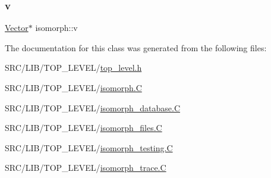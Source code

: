 \subsubsection{\texorpdfstring{v}{v}}
{\footnotesize\ttfamily \mbox{\hyperlink{class_vector}{Vector}}$\ast$ isomorph\+::v}



The documentation for this class was generated from the following files\+:\begin{DoxyCompactItemize}
\item 
S\+R\+C/\+L\+I\+B/\+T\+O\+P\+\_\+\+L\+E\+V\+E\+L/\mbox{\hyperlink{top__level_8h}{top\+\_\+level.\+h}}\item 
S\+R\+C/\+L\+I\+B/\+T\+O\+P\+\_\+\+L\+E\+V\+E\+L/\mbox{\hyperlink{isomorph_8_c}{isomorph.\+C}}\item 
S\+R\+C/\+L\+I\+B/\+T\+O\+P\+\_\+\+L\+E\+V\+E\+L/\mbox{\hyperlink{isomorph__database_8_c}{isomorph\+\_\+database.\+C}}\item 
S\+R\+C/\+L\+I\+B/\+T\+O\+P\+\_\+\+L\+E\+V\+E\+L/\mbox{\hyperlink{isomorph__files_8_c}{isomorph\+\_\+files.\+C}}\item 
S\+R\+C/\+L\+I\+B/\+T\+O\+P\+\_\+\+L\+E\+V\+E\+L/\mbox{\hyperlink{isomorph__testing_8_c}{isomorph\+\_\+testing.\+C}}\item 
S\+R\+C/\+L\+I\+B/\+T\+O\+P\+\_\+\+L\+E\+V\+E\+L/\mbox{\hyperlink{isomorph__trace_8_c}{isomorph\+\_\+trace.\+C}}\end{DoxyCompactItemize}
